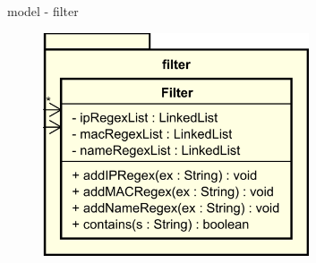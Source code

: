 \begin{frame}{model - filter}
  \begin{figure}
    \centering
    \includegraphics[width=0.7\textwidth]{./images/filter.png}
  \end{figure}
\end{frame}
